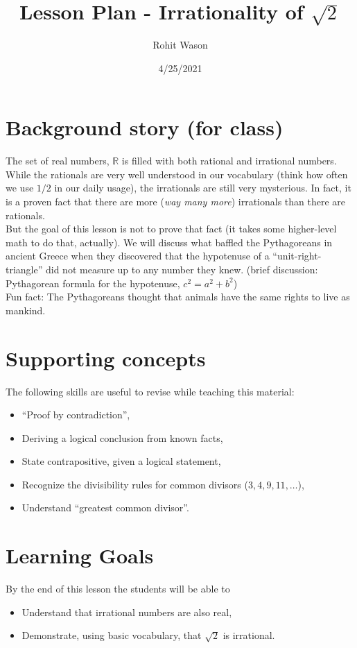 \documentclass{article}
\author{Rohit Wason}
\title{Lesson Plan - Irrationality of $\sqrt{2}$}
\date{4/25/2021}
\begin{document}
\maketitle

\section*{Background story (for class)}
The set of real numbers, $\mathbb{R}$ is filled with both rational
and irrational numbers. While the rationals are very well understood in our 
vocabulary (think how often we use $1/2$ in our daily usage), the irrationals
are still very mysterious. In fact, it is a proven fact that there are more
(\textit{way many more}) irrationals than there are rationals.\\

But the goal of this lesson is not to prove that fact (it takes some
higher-level math to do that, actually). We will discuss what baffled the 
Pythagoreans in ancient Greece when they discovered that the hypotenuse of a 
``unit-right-triangle'' did not measure up to any number they knew.
(brief discussion: Pythagorean formula for the hypotenuse, $c^2=a^2+b^2$)\\

Fun fact: The Pythagoreans thought that animals have the same rights to live as mankind.

\section*{Supporting concepts}
The following skills are useful to revise while teaching this material:
\begin{itemize}
  \item ``Proof by contradiction'',
  \item Deriving a logical conclusion from known facts,
  \item State contrapositive, given a logical statement,
  \item Recognize the divisibility rules for common divisors ($3,4,9,11,\dots$),
  \item Understand ``greatest common divisor''.
\end{itemize}

\section*{Learning Goals}
By the end of this lesson the students will be able to
\begin{itemize}
  \item Understand that irrational numbers are also real,
  \item Demonstrate, using basic vocabulary, that $\sqrt{2}$ is irrational.
\end{itemize}
\end{document}

